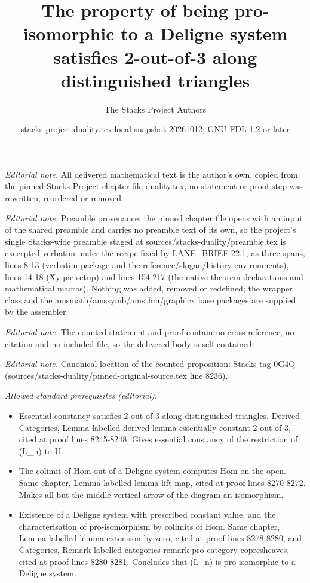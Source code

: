 \documentclass[10pt,a4paper]{amsart}
\title{The property of being pro-isomorphic to a Deligne system satisfies 2-out-of-3 along distinguished triangles}
\author{The Stacks Project Authors}
\date{stacks-project:duality.tex:local-snapshot-20261012; GNU FDL 1.2 or later}
\theoremstyle{plain}
\theoremstyle{definition}
\theoremstyle{remark}
\numberwithin{equation}{subsection}
\begin{document}
\maketitle
\noindent\textit{Editorial note.} All delivered mathematical text is the author's own, copied from the pinned Stacks Project chapter file duality.tex; no statement or proof step was rewritten, reordered or removed.\par\medskip
\noindent\textit{Editorial note.} Preamble provenance: the pinned chapter file opens with an input of the shared preamble and carries no preamble text of its own, so the project's single Stacks-wide preamble staged at sources/stacks-duality/preamble.tex is excerpted verbatim under the recipe fixed by LANE\_BRIEF 22.1, as three spans, lines 8-13 (verbatim package and the reference/slogan/history environments), lines 14-18 (Xy-pic setup) and lines 154-217 (the native theorem declarations and mathematical macros). Nothing was added, removed or redefined; the wrapper class and the amsmath/amssymb/amsthm/graphicx base packages are supplied by the assembler.\par\medskip
\noindent\textit{Editorial note.} The counted statement and proof contain no cross reference, no citation and no included file, so the delivered body is self contained.\par\medskip
\noindent\textit{Editorial note.} Canonical location of the counted proposition: Stacks tag 0G4Q (sources/stacks-duality/pinned-original-source.tex line 8236).\par\medskip
\noindent\textit{Allowed standard prerequisites (editorial).}\begin{itemize}
\item Essential constancy satisfies 2-out-of-3 along distinguished triangles. Derived Categories, Lemma labelled derived-lemma-essentially-constant-2-out-of-3, cited at proof lines 8245-8248. Gives essential constancy of the restriction of (L\_n) to U.
\item The colimit of Hom out of a Deligne system computes Hom on the open. Same chapter, Lemma labelled lemma-lift-map, cited at proof lines 8270-8272. Makes all but the middle vertical arrow of the diagram an isomorphism.
\item Existence of a Deligne system with prescribed constant value, and the characterisation of pro-isomorphism by colimits of Hom. Same chapter, Lemma labelled lemma-extension-by-zero, cited at proof lines 8278-8280, and Categories, Remark labelled categories-remark-pro-category-copresheaves, cited at proof lines 8280-8281. Concludes that (L\_n) is pro-isomorphic to a Deligne system.
\end{itemize}\medskip
\end{document}
